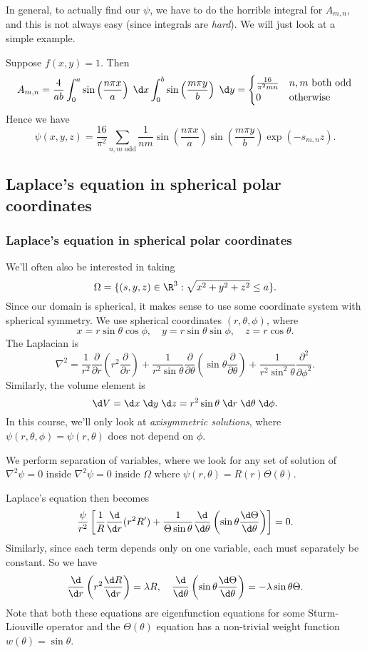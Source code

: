 \documentclass[a4paper]{article}
\begin{document}
In general, to actually find our $\psi$, we have to do the horrible integral for $A_{m, n}$, and this is not always easy (since integrals are \emph{hard}). We will just look at a simple example.
\begin{eg}
  Suppose $f(x, y) = 1$. Then
  \[
    A_{m, n} = \frac{4}{ab} \int_0^a \sin \left(\frac{n\pi x}{a}\right)\;\d x \int_0^ b \sin \left(\frac{m\pi y}{b}\right)\;\d y =
    \begin{cases}
      \frac{16}{\pi^2 mn} & n, m\text{ both odd}\\
      0 & \text{otherwise}
    \end{cases}
  \]
  Hence we have
  \[
    \psi(x, y, z) = \frac{16}{\pi^2}\sum_{n, m\text{ odd}} \frac{1}{nm}\sin\left(\frac{n\pi x}{a}\right) \sin \left(\frac{m\pi y}{b}\right) \exp(-s_{m, n}z).
  \]
\end{eg}

\subsection{Laplace's equation in spherical polar coordinates}
\subsubsection{Laplace's equation in spherical polar coordinates}

We'll often also be interested in taking
\[
  \Omega = \{(s, y, z)\in \R^3: \sqrt{x^2 + y^2 + z^2} \leq a\}.
\]
Since our domain is spherical, it makes sense to use some coordinate system with spherical symmetry. We use spherical coordinates $(r, \theta, \phi)$, where
\[
  x = r\sin \theta \cos \phi,\quad y = r\sin \theta \sin \phi,\quad z = r\cos \theta.
\]
The Laplacian is
\[
  \nabla^2 = \frac{1}{r^2}\frac{\partial}{\partial r}\left(r^2 \frac{\partial}{\partial r}\right) + \frac{1}{r^2 \sin \theta} \frac{\partial}{\partial \theta}\left(\sin \theta \frac{\partial}{\partial \theta}\right) + \frac{1}{r^2 \sin^2 \theta}\frac{\partial^2}{\partial\phi^2}.
\]
Similarly, the volume element is
\[
  \d V = \d x\;\d y\;\d z = r^2 \sin \theta \;\d r\;\d \theta \;\d \phi.
\]
In this course, we'll only look at \emph{axisymmetric solutions}, where $\psi(r, \theta, \phi) = \psi(r, \theta)$ does not depend on $\phi$.

We perform separation of variables, where we look for any set of solution of $\nabla^2 \psi = 0$ inside $\nabla^2 \psi = 0$ inside $\Omega$ where $\psi(r, \theta) = R(r) \Theta(\theta)$.

Laplace's equation then becomes
\[
  \frac{\psi}{r^2}\left[\frac{1}{R}\frac{\d}{\d r}(r^2 R') + \frac{1}{\Theta \sin \theta}\frac{\d}{\d \theta}\left(\sin \theta \frac{\d \Theta}{\d \theta}\right)\right] = 0.
\]
Similarly, since each term depends only on one variable, each must separately be constant. So we have
\[
  \frac{\d}{\d r}\left(r^2 \frac{\d R}{\d r}\right) = \lambda R,\quad \frac{\d}{\d \theta}\left(\sin \theta \frac{\d \Theta}{\d \theta}\right) = -\lambda \sin \theta \Theta.
\]
Note that both these equations are eigenfunction equations for some Sturm-Liouville operator and the $\Theta(\theta)$ equation has a non-trivial weight function $w(\theta) = \sin \theta$.
\end{document}
